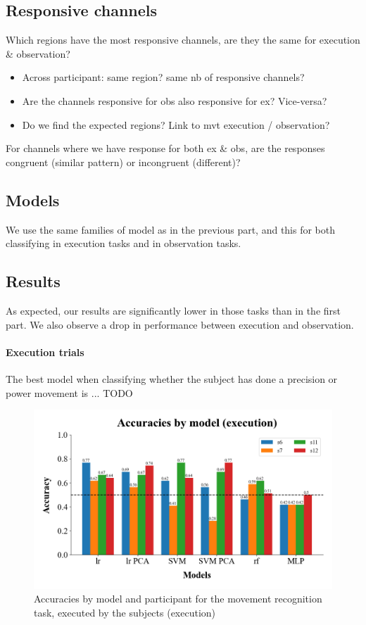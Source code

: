 \documentclass[10pt,conference,compsocconf]{IEEEtran}
\begin{document}
\subsection{Responsive channels}
Which regions have the most responsive channels, are they the same for execution \& observation?

\begin{itemize}
    \item Across participant: same region? same nb of responsive channels?
    \item Are the channels responsive for obs also responsive for ex? Vice-versa?
    \item Do we find the expected regions? Link to mvt execution / observation?
\end{itemize}

For channels where we have response for both ex \& obs, are the responses congruent (similar pattern) or incongruent (different)?

\subsection{Models}
We use the same families of model as in the previous part, and this for both classifying in execution tasks and in observation tasks.

\subsection{Results}
As expected, our results are significantly lower in those tasks than in the first part. We also observe a drop in performance between execution and observation.

\paragraph{Execution trials}
The best model when classifying whether the subject has done a precision or power movement is ... TODO

\begin{figure}[h!]
  \center
  \includegraphics[width=\linewidth]{../figures/accuracies_across_part_ex.png}
  \caption{Accuracies by model and participant for the movement recognition task, executed by the subjects (execution)}
\end{figure}
\FloatBarrier
\end{document}
